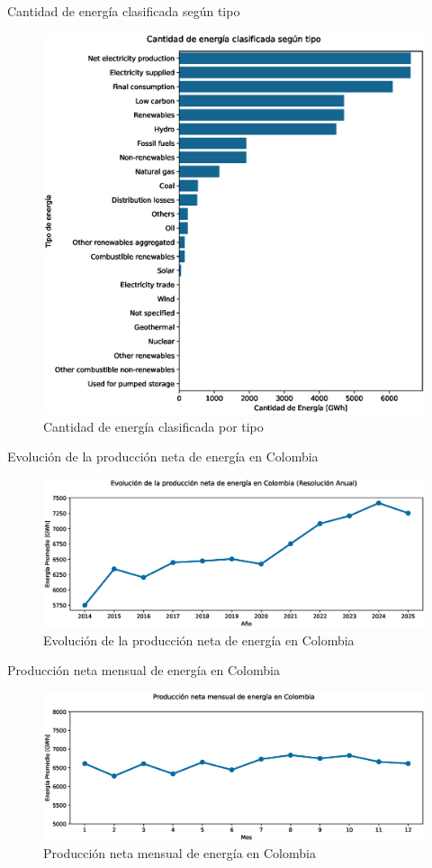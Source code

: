 \documentclass[10pt]{beamer}
\begin{document}
\begin{frame}[fragile]{Cantidad de energía clasificada según tipo}
\begin{figure}[t]
	\centering
	\includegraphics[width=0.6\linewidth]{../../reports/fig_3}
	\caption{Cantidad de energ\'ia clasificada por tipo}
	\label{fig:fig3}
\end{figure}
\end{frame}
	
\begin{frame}[fragile]{Evolución de la producción neta de energía en Colombia}
\begin{figure}[t]
	\centering
	\includegraphics[width=0.7\linewidth]{../../reports/fig_4}
	\caption{Evolución de la producción neta de energía en Colombia}
	\label{fig:fig4}
\end{figure}
\end{frame}
	
\begin{frame}[fragile]{Producción neta mensual de energía en Colombia}
	\begin{figure}[t]
		\centering
		\includegraphics[width=0.7\linewidth]{../../reports/fig_5}
		\caption{Producción neta mensual de energía en Colombia}
		\label{fig:fig5}
	\end{figure}
\end{frame}
\end{document}
